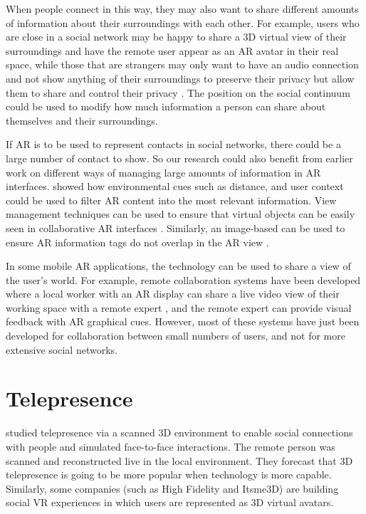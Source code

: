 When people connect in this way, they may also want to share different amounts of information about their surroundings with each other. For example, users who are close in a social network may be happy to share a 3D virtual view of their surroundings and have the remote user appear as an AR avatar in their real space, while those that are strangers may only want to have an audio connection and not show anything of their surroundings to preserve their privacy but allow them to share and control their privacy \cite{Oetzel2011}. The position on the social continuum could be used to modify how much information a person can share about themselves and their surroundings.

If AR is to be used to represent contacts in social networks, there could be a large number of contact to show. So our research could also benefit from earlier work on different ways of managing large amounts of information in AR interfaces. \cite{Julier2002} showed how environmental cues such as distance, and user context could be used to filter AR content into the most relevant information. View management techniques can be used to ensure that virtual objects can be easily seen in collaborative AR interfaces \cite{Hollerer2001}. Similarly, an image-based can be used to ensure AR information tags do not overlap in the AR view \cite{Grasset2012}. 

In some mobile AR applications, the technology can be used to share a view of the user's world. For example, remote collaboration systems have been developed where a local worker with an AR display can share a live video view of their working space with a remote expert \cite{Billinghurst2002}, and the remote expert can provide visual feedback with AR graphical cues. However, most of these systems have just been developed for collaboration between small numbers of users, and not for more extensive social networks.

\section{Telepresence}

\cite{Fuchs2014} studied telepresence via a scanned 3D environment to enable social connections with people and simulated face-to-face interactions. The remote person was scanned and reconstructed live in the local environment. They forecast that 3D telepresence is going to be more popular when technology is more capable. Similarly, some companies (such as High Fidelity and Itsme3D) are building social VR experiences in which users are represented as 3D virtual avatars.


